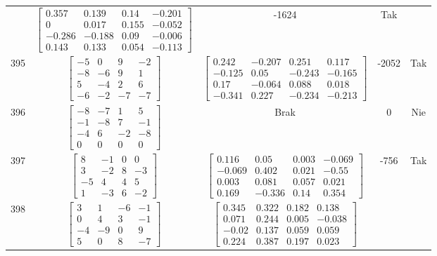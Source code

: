 \documentclass[a4paper,12pt]{article}
\begin{document}
\begin{tabular}{c c c c c}
&
$\begin{bmatrix} 0.357 & 0.139 & 0.14 & -0.201 \\ 0 & 0.017 & 0.155 & -0.052 \\ -0.286 & -0.188 & 0.09 & -0.006 \\ 0.143 & 0.133 & 0.054 & -0.113 \end{bmatrix}$
&
-1624
&
Tak
\\
395
&
$\begin{bmatrix} -5 & 0 & 9 & -2 \\ -8 & -6 & 9 & 1 \\ 5 & -4 & 2 & 6 \\ -6 & -2 & -7 & -7 \end{bmatrix}$
&
$\begin{bmatrix} 0.242 & -0.207 & 0.251 & 0.117 \\ -0.125 & 0.05 & -0.243 & -0.165 \\ 0.17 & -0.064 & 0.088 & 0.018 \\ -0.341 & 0.227 & -0.234 & -0.213 \end{bmatrix}$
&
-2052
&
Tak
\\
396
&
$\begin{bmatrix} -8 & -7 & 1 & 5 \\ -1 & -8 & 7 & -1 \\ -4 & 6 & -2 & -8 \\ 0 & 0 & 0 & 0 \end{bmatrix}$
&
Brak
&
0
&
Nie
\\
397
&
$\begin{bmatrix} 8 & -1 & 0 & 0 \\ 3 & -2 & 8 & -3 \\ -5 & 4 & 4 & 5 \\ 1 & -3 & 6 & -2 \end{bmatrix}$
&
$\begin{bmatrix} 0.116 & 0.05 & 0.003 & -0.069 \\ -0.069 & 0.402 & 0.021 & -0.55 \\ 0.003 & 0.081 & 0.057 & 0.021 \\ 0.169 & -0.336 & 0.14 & 0.354 \end{bmatrix}$
&
-756
&
Tak
\\
398
&
$\begin{bmatrix} 3 & 1 & -6 & -1 \\ 0 & 4 & 3 & -1 \\ -4 & -9 & 0 & 9 \\ 5 & 0 & 8 & -7 \end{bmatrix}$
&
$\begin{bmatrix} 0.345 & 0.322 & 0.182 & 0.138 \\ 0.071 & 0.244 & 0.005 & -0.038 \\ -0.02 & 0.137 & 0.059 & 0.059 \\ 0.224 & 0.387 & 0.197 & 0.023 \end{bmatrix}$

\end{tabular}
\end{document}
